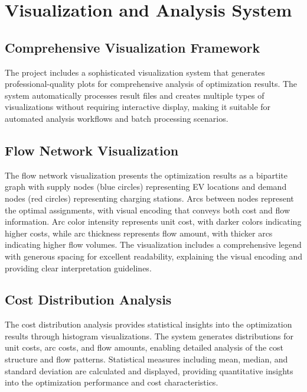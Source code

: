 \documentclass[12pt,a4paper]{article}
\begin{document}
\section{Visualization and Analysis System}

\subsection{Comprehensive Visualization Framework}

The project includes a sophisticated visualization system that generates professional-quality plots for comprehensive analysis of optimization results. The system automatically processes result files and creates multiple types of visualizations without requiring interactive display, making it suitable for automated analysis workflows and batch processing scenarios.

\subsection{Flow Network Visualization}

The flow network visualization presents the optimization results as a bipartite graph with supply nodes (blue circles) representing EV locations and demand nodes (red circles) representing charging stations. Arcs between nodes represent the optimal assignments, with visual encoding that conveys both cost and flow information. Arc color intensity represents unit cost, with darker colors indicating higher costs, while arc thickness represents flow amount, with thicker arcs indicating higher flow volumes. The visualization includes a comprehensive legend with generous spacing for excellent readability, explaining the visual encoding and providing clear interpretation guidelines.

\subsection{Cost Distribution Analysis}

The cost distribution analysis provides statistical insights into the optimization results through histogram visualizations. The system generates distributions for unit costs, arc costs, and flow amounts, enabling detailed analysis of the cost structure and flow patterns. Statistical measures including mean, median, and standard deviation are calculated and displayed, providing quantitative insights into the optimization performance and cost characteristics.
\end{document}

